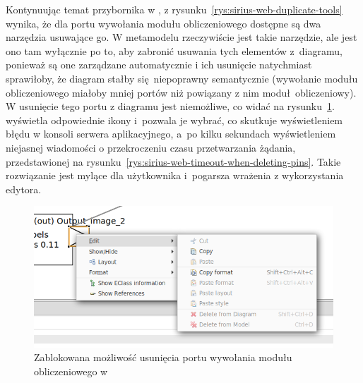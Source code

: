 Kontynuując temat przybornika w \SiriusWeb{}, z
rysunku~\ref{rys:sirius-web-duplicate-tools} wynika, że dla portu wywołania
modułu obliczeniowego dostępne są dwa narzędzia usuwające go. W
metamodelu rzeczywiście jest takie narzędzie, ale jest ono tam wyłącznie po to,
aby zabronić usuwania tych elementów z~diagramu, ponieważ są one zarządzane
automatycznie i ich usunięcie natychmiast sprawiłoby, że diagram stałby
się niepoprawny semantycznie (wywołanie modułu obliczeniowego miałoby mniej
portów niż powiązany z nim moduł obliczeniowy). W \SiriusDesktop{}
usunięcie tego portu z diagramu jest niemożliwe, co widać na
rysunku~\ref{rys:sirius-desktop-blocked-deleting-pins}.
\SiriusWeb{} wyświetla odpowiednie ikony i~pozwala je wybrać, co skutkuje
wyświetleniem błędu w konsoli serwera aplikacyjnego, a~po kilku sekundach
wyświetleniem niejasnej wiadomości o przekroczeniu czasu przetwarzania żądania,
przedstawionej na rysunku~\ref{rys:sirius-web-timeout-when-deleting-pins}.
Takie rozwiązanie jest mylące dla użytkownika i~pogarsza wrażenia z
wykorzystania edytora.

\begin{figure}[!ht]
  \centering

  \includegraphics[width=0.95\linewidth]{./images/sirius-desktop-blocked-deleting-pins.png}
  \caption{Zablokowana możliwość usunięcia portu wywołania modułu
    obliczeniowego w \SiriusDesktop{}}\label{rys:sirius-desktop-blocked-deleting-pins}
\end{figure}

